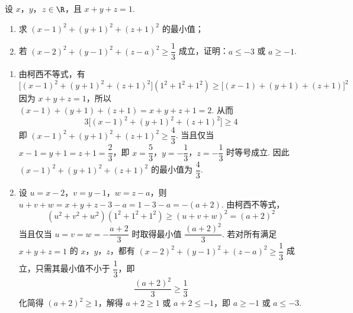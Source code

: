 \begin{problem}
设 \(x\)，\(y\)，\(z\in\R\)，且 \(x+y+z=1\).

\begin{enumerate}
\item 求 \((x-1)^2+(y+1)^2+(z+1)^2\) 的最小值；
\item 若 \((x-2)^2+(y-1)^2+(z-a)^2\ge \dfrac13\) 成立，证明：\(a\le -3\) 或 \(a\ge -1\).
\end{enumerate}
\end{problem}

\begin{solution}
\begin{enumerate}
\item 由柯西不等式，有
\[
\bigl[(x-1)^2+(y+1)^2+(z+1)^2\bigr](1^2+1^2+1^2)\ge\bigl[(x-1)+(y+1)+(z+1)\bigr]^2
\]
因为 \(x+y+z=1\)，所以 \((x-1)+(y+1)+(z+1)=x+y+z+1=2\).
从而
\[
3\bigl[(x-1)^2+(y+1)^2+(z+1)^2\bigr]\ge4
\]
即 \((x-1)^2+(y+1)^2+(z+1)^2\ge\dfrac43\). 当且仅当 \(x-1=y+1=z+1=\dfrac23\)，即 \(x=\dfrac53\)，\(y=-\dfrac13\)，\(z=-\dfrac13\) 时等号成立. 因此 \((x-1)^2+(y+1)^2+(z+1)^2\) 的最小值为 \(\dfrac43\).

\item 设 \(u=x-2\)，\(v=y-1\)，\(w=z-a\)，则 \(u+v+w=x+y+z-3-a=1-3-a=-(a+2)\).
由柯西不等式，
\[
(u^2+v^2+w^2)(1^2+1^2+1^2)\ge(u+v+w)^2=(a+2)^2
\]
当且仅当 \(u=v=w=-\dfrac{a+2}{3}\) 时取得最小值 \(\dfrac{(a+2)^2}{3}\).
若对所有满足 \(x+y+z=1\) 的 \(x\)，\(y\)，\(z\)，都有 \((x-2)^2+(y-1)^2+(z-a)^2\ge\dfrac13\) 成立，只需其最小值不小于 \(\dfrac13\)，即
\[
\frac{(a+2)^2}{3}\ge\frac13
\]
化简得 \((a+2)^2\ge1\)，解得 \(a+2\ge1\) 或 \(a+2\le-1\)，即 \(a\ge-1\) 或 \(a\le-3\).
\end{enumerate}
\end{solution}
